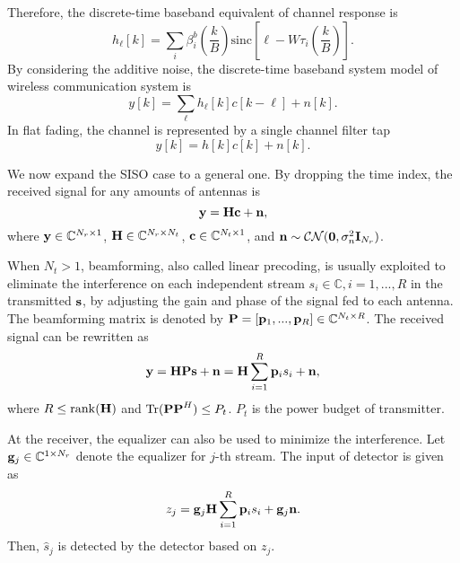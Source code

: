 Therefore, the discrete-time baseband equivalent of channel response is 
\begin{equation}
    h_\ell[k] = \sum_i \beta_i^b \left( \frac{k}{B} \right) \mathrm{sinc} \left[ \ell- W \tau_i\left( \frac{k}{B} \right) \right].
\end{equation}
By considering the additive noise, the discrete-time baseband system model of wireless communication system is
\begin{equation}
    y[k] = \sum_\ell h_\ell[k]c[k-\ell] + n[k].
\end{equation}
In flat fading, the channel is represented by a single channel filter tap \cite{tse2005fundamentals}
\begin{equation}
    y[k] = h[k]c[k] + n[k].
\end{equation}

We now expand the SISO case to a general one. By dropping the time index, the received signal for any amounts of antennas is
\begin{equation}
    {\bf y} = {\bf H} {\bf c} + {\bf n},
\end{equation}
where ${\bf y} \in \mathbb{C}^{N_r \times 1}$, ${\bf H} \in \mathbb{C}^{N_r \times N_t}$, ${\bf c}\in \mathbb{C}^{N_t \times 1}$,
and ${\bf n} \sim \mathcal{CN}({\bf 0}, \sigma_n^2 {\bf I}_{N_r})$.

When $N_t > 1$, beamforming, also called linear precoding, is usually exploited to eliminate the interference on 
each independent stream $s_i \in \mathbb{C}, i=1,...,R$ in the transmitted ${\bf s}$, by adjusting the gain and phase of the signal fed to each antenna.
The beamforming matrix is denoted by ${\bf P} = [{\bf p}_1,...,{\bf p}_R] \in \mathbb{C}^{N_t \times R}$. The received signal 
can be rewritten as
\begin{equation} \label{eqn:wireless-received-signal-beamforming}
    {\bf y} = {\bf HPs + n} = {\bf H}\sum_{i=1}^R {\bf p}_is_i + {\bf n},
\end{equation}
where $R \leq {\rm rank}({\bf H})$ and ${\rm Tr}({\bf PP}^H) \leq P_t$. $P_t$ is the power budget of transmitter.

At the receiver, the equalizer can also be used to minimize the interference. Let ${\bf g}_j \in \mathbb{C}^{1 \times N_r}$
denote the equalizer for $j$-th stream. The input of detector is given as
\begin{equation}
    z_j = {\bf g}_j{\bf H}\sum_{i=1}^R {\bf p}_is_i + {\bf g}_j {\bf n}.
\end{equation}
Then, $\hat{s}_j$ is detected by the detector based on $z_j$.


